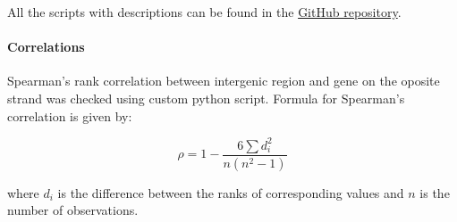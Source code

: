 All the scripts with descriptions can be found in the \href{https://github.com/JuozapasI/MasterThesis/}{GitHub repository}.

\paragraph{Correlations}

Spearman's rank correlation between intergenic region and gene on the oposite strand was checked using custom python script.
Formula for Spearman's correlation is given by:

$$\rho = 1 - \frac{6 \sum d_i^2}{n(n^2 - 1)}$$

where $d_i$ is the difference between the ranks of corresponding values and $n$ is the number of observations.
